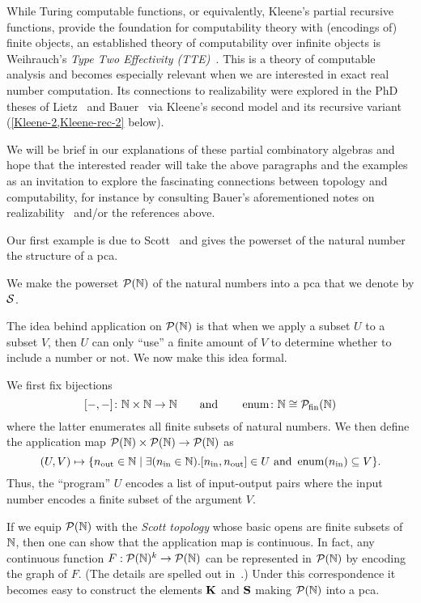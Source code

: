 While Turing computable functions, or equivalently, Kleene's partial recursive
functions, provide the foundation for computability theory with (encodings of)
finite objects, an established theory of computability over infinite objects is
Weihrauch's \emph{Type Two Effectivity (TTE)}~\cite{Weihrauch2000}.
%
This is a theory of computable analysis and becomes especially relevant when we
are interested in exact real number computation.
%
Its connections to realizability were explored in the PhD theses of
Lietz~\cite{Lietz2004} and Bauer~\cite{Bauer2000} via Kleene's second model and
its recursive variant (\cref{Kleene-2,Kleene-rec-2} below).

We will be brief in our explanations of these partial combinatory algebras and hope
that the interested reader will take the above paragraphs and the examples as an
invitation to explore the fascinating connections between topology and
computability, for instance by consulting Bauer's aforementioned notes on
realizability~\cite{Bauer2023} and/or the references above.

Our first example is due to Scott~\cite{Scott1976} and gives the powerset of the
natural number the structure of a pca.

\begin{example}
  We make the powerset \(\mathcal P(\mathbb N)\) of the natural numbers into a pca that we denote
  by \(\mathcal S\).

  The idea behind application on \(\mathcal P(\mathbb N)\) is that when we apply a subset \(U\) to
  a subset \(V\), then \(U\) can only ``use'' a finite amount of \(V\) to
  determine whether to include a number or not. We now make this idea formal.

  We first fix bijections
  \[
    [{-},{-}] \colon \mathbb N \times \mathbb N \to \mathbb N
    \quad\quad\text{and}\quad\quad
    \operatorname{enum} \colon \mathbb N \cong \mathcal P_{\operatorname{fin}}(\mathbb N)
  \]
  where the latter enumerates all finite subsets of natural numbers.
  We then define the application map \(\mathcal P(\mathbb N) \times \mathcal P(\mathbb N) \to \mathcal P(\mathbb N)\) as
  \[
    (U,V) \mapsto \{n_{\operatorname{out}} \in \mathbb N \mid
            \exists(n_{\operatorname{in}} \in \mathbb N) .
            [n_{\operatorname{in}},n_{\operatorname{out}}] \in U \text{ and } \operatorname{enum}(n_{\operatorname{in}}) \subseteq V\}.
  \]
  Thus, the ``program'' \(U\) encodes a list of input-output pairs where the
  input number encodes a finite subset of the argument \(V\).

  If we equip \(\mathcal P(\mathbb N)\) with the \emph{Scott topology} whose basic opens are
  finite subsets of \(\mathbb N\), then one can show that the application map is
  continuous.
  In fact, any continuous function \(F : \mathcal P(\mathbb N)^k \to \mathcal P(\mathbb N)\) can be represented in
  \(\mathcal P(\mathbb N)\) by encoding the graph of \(F\).
  (The details are spelled out in~\cite[Example~2.3.4]{deJong2018}.)
  Under this correspondence it becomes easy to construct the elements \(\operatorname{\mathbf{K}}\)
  and \(\operatorname{\mathbf{S}}\) making \(\mathcal P(\mathbb N)\) into a pca.
\end{example}

